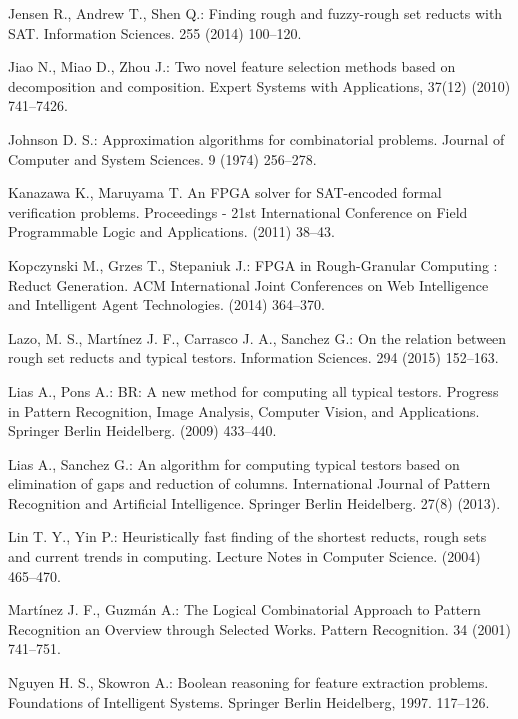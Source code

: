 \documentclass[11pt]{article}   %
\begin{document}
\begin{thebibliography}{}
	Jensen R., Andrew T., Shen Q.:
	Finding rough and fuzzy-rough set reducts with SAT.
	Information Sciences. 255 (2014) 100--120.
	
	Jiao N., Miao D., Zhou J.:
 	Two novel feature selection methods based on decomposition and composition.
 	Expert Systems with Applications, 37(12) (2010) 741--7426.
 	
	Johnson D. S.:
	Approximation algorithms for combinatorial problems. 
	Journal of Computer and System Sciences. 9 (1974) 256--278.

	Kanazawa K., Maruyama T.
	An FPGA solver for SAT-encoded formal verification problems. 
	Proceedings - 21st International Conference on Field Programmable Logic and Applications. (2011) 38--43.

	Kopczynski M., Grzes T., Stepaniuk J.:
	FPGA in Rough-Granular Computing : Reduct Generation.
	ACM International Joint Conferences on Web Intelligence and Intelligent Agent Technologies. (2014) 364--370. 

	Lazo, M. S., Martínez J. F., Carrasco J. A., Sanchez G.:
	On the relation between rough set reducts and typical testors.
	Information Sciences. 294 (2015) 152--163.

	 Lias A., Pons A.:
	 BR: A new method for computing all typical testors.
	 Progress in Pattern Recognition, Image Analysis, Computer Vision, and Applications. 
	 Springer Berlin Heidelberg. (2009) 433--440.

	 Lias A., Sanchez G.:
	 An algorithm for computing typical testors based on elimination of gaps and reduction of columns.
	 International Journal of Pattern Recognition and Artificial Intelligence. 
	 Springer Berlin Heidelberg. 27(8) (2013).
	 
	 Lin T. Y., Yin P.:
	 Heuristically fast finding of the shortest reducts, rough sets and current trends in computing.
	 Lecture Notes in Computer Science. (2004) 465--470.
	
	Mart\'inez J. F., Guzm\'an A.:
	The Logical Combinatorial Approach to Pattern Recognition an Overview through Selected Works. 
	Pattern Recognition. 34 (2001) 741--751.

	Nguyen H. S., Skowron A.:
	Boolean reasoning for feature extraction problems.
	Foundations of Intelligent Systems. Springer Berlin Heidelberg, 1997. 117--126.	
	

\end{thebibliography}
\end{document}
